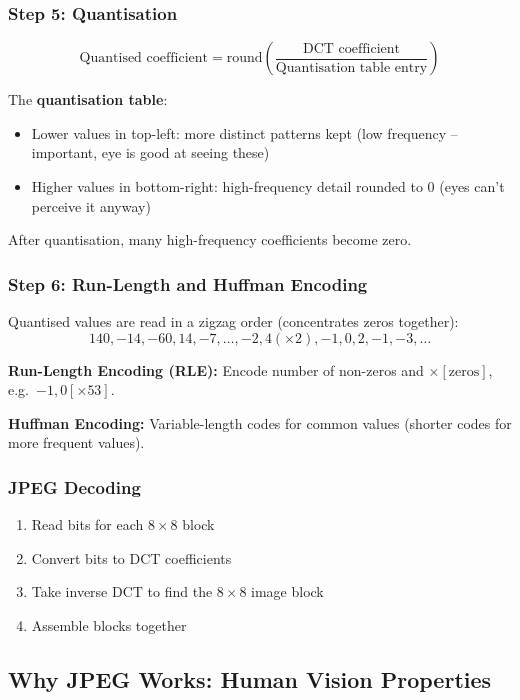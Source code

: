\documentclass[12pt,a4paper]{article}
\begin{document}
\subsubsection{Step 5: Quantisation}

\[
\text{Quantised coefficient} = \mathrm{round}\!\left(\frac{\text{DCT coefficient}}{\text{Quantisation table entry}}\right)
\]

The \textbf{quantisation table}:
\begin{itemize}
  \item Lower values in top-left: more distinct patterns kept (low frequency -- important, eye is good at seeing these)
  \item Higher values in bottom-right: high-frequency detail rounded to 0 (eyes can't perceive it anyway)
\end{itemize}

After quantisation, many high-frequency coefficients become zero.

\subsubsection{Step 6: Run-Length and Huffman Encoding}

Quantised values are read in a zigzag order (concentrates zeros together):
\[
140, -14, -60, 14, -7, \ldots, -2, 4(\times2), -1, 0, 2, -1, -3, \ldots
\]

\textbf{Run-Length Encoding (RLE):} Encode number of non-zeros and $\times[\text{zeros}]$, e.g.\ $-1, 0[\times53]$.

\textbf{Huffman Encoding:} Variable-length codes for common values (shorter codes for more frequent values).

\subsubsection{JPEG Decoding}
\begin{enumerate}
  \item Read bits for each $8\times8$ block
  \item Convert bits to DCT coefficients
  \item Take inverse DCT to find the $8\times8$ image block
  \item Assemble blocks together
\end{enumerate}

\subsection{Why JPEG Works: Human Vision Properties}
\end{document}
